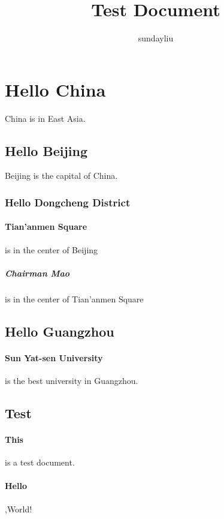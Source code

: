 \documentclass{article}
\author{sundayliu}
\title{Test Document}
\date{}
\begin{document}
\maketitle
\tableofcontents
\section{Hello China} China is in East Asia.
\subsection{Hello Beijing} Beijing is the capital of China.
\subsubsection{Hello Dongcheng District}
\paragraph{Tian'anmen Square} is in the center of Beijing
\subparagraph{Chairman Mao}is in the center of Tian'anmen Square
\subsection{Hello Guangzhou}
\paragraph{Sun Yat-sen University} is the best university in Guangzhou.
\subsection{Test}
\paragraph{This} is a test document.
\paragraph{Hello},World!
\end{document}
